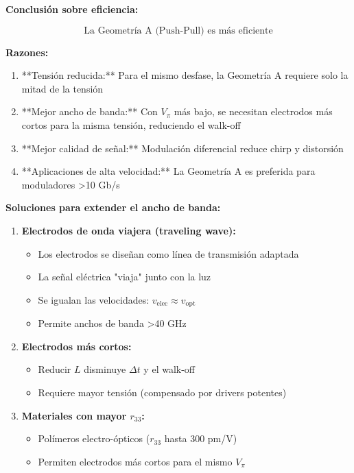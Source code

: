 \documentclass[12pt,a4paper]{article}
\begin{document}
\begin{enumerate}
\textbf{Conclusión sobre eficiencia:}

\begin{equation}
    \boxed{\text{La Geometría A (Push-Pull) es más eficiente}}
\end{equation}

\textbf{Razones:}

\begin{enumerate}
    \item **Tensión reducida:** Para el mismo desfase, la Geometría A requiere solo la mitad de la tensión
    
    \item **Mejor ancho de banda:** Con $V_\pi$ más bajo, se necesitan electrodos más cortos para la misma tensión, reduciendo el walk-off
    
    \item **Mejor calidad de señal:** Modulación diferencial reduce chirp y distorsión
    
    \item **Aplicaciones de alta velocidad:** La Geometría A es preferida para moduladores >10 Gb/s
\end{enumerate}

\textbf{Soluciones para extender el ancho de banda:}

\begin{enumerate}
    \item \textbf{Electrodos de onda viajera (traveling wave):}
    \begin{itemize}
        \item Los electrodos se diseñan como línea de transmisión adaptada
        \item La señal eléctrica "viaja" junto con la luz
        \item Se igualan las velocidades: $v_{\text{elec}} \approx v_{\text{opt}}$
        \item Permite anchos de banda >40 GHz
    \end{itemize}
    
    \item \textbf{Electrodos más cortos:}
    \begin{itemize}
        \item Reducir $L$ disminuye $\Delta t$ y el walk-off
        \item Requiere mayor tensión (compensado por drivers potentes)
    \end{itemize}
    
    \item \textbf{Materiales con mayor $r_{33}$:}
    \begin{itemize}
        \item Polímeros electro-ópticos ($r_{33}$ hasta 300 pm/V)
        \item Permiten electrodos más cortos para el mismo $V_\pi$
    \end{itemize}
\end{enumerate}


\end{enumerate}
\end{document}
